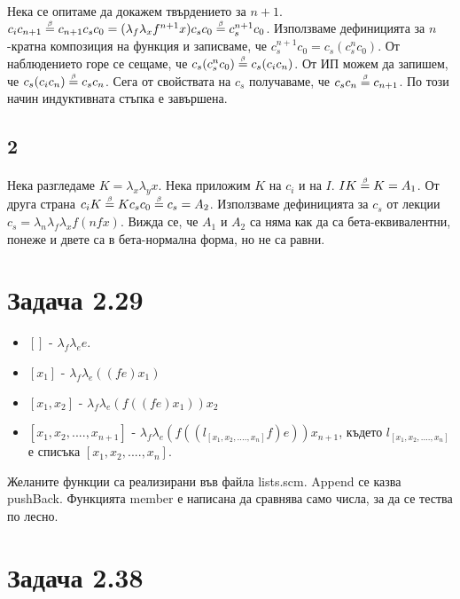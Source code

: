 \documentclass[12pt]{article}
\begin{document}
\paragraph*{}
Нека се опитаме да докажем твърдението за $n+1$. $c_i c_{n+1} \betaeq c_{n+1} c_s c_0 = (\lambda_f \lambda_x f^{n+1} x) c_s c_0 \betaeq c_s^{n+1} c_0$. Използваме дефиницията за $n$-кратна композиция на функция и записваме, че $c_s^{n+1} c_0 = c_s (c_s^n c_0)$. От наблюдението горе се сещаме, че $c_s (c_s^n c_0) \betaeq c_s (c_i c_n)$. От ИП можем да запишем, че $c_s (c_i c_n) \betaeq c_s c_n$. Сега от свойствата на $c_s$ получаваме, че $c_s c_n \betaeq c_{n+1}$. По този начин индуктивната стъпка е завършена.

\subsection*{2}
\paragraph*{}
Нека разгледаме $K = \lambda_x \lambda_y x$. Нека приложим $K$ на $c_i$ и на $I$. $I K \betaeq K = A_1$. От друга страна $c_i K \betaeq K c_s c_0 \betaeq c_s = A_2$. Използваме дефиницията за $c_s$ от лекции $c_s = \lambda_n \lambda_f \lambda_x f (n f x)$. Вижда се, че $A_1$ и $A_2$ са няма как да са бета-еквивалентни, понеже и двете са в бета-нормална форма, но не са равни. 

\section*{Задача 2.29}
\begin{itemize}
	\item $[]$ - $\lambda_f \lambda_e e$.
	\item $[x_1]$ - $\lambda_f \lambda_e ((fe)x_1)$	
	\item $[x_1, x_2]$ - $\lambda_f \lambda_e (f((fe)x_1))x_2$
	\item $[x_1, x_2, ...., x_{n+1}]$ - $\lambda_f \lambda_e (f((l_{[x_1, x_2, ...., x_{n}]} f) e)) x_{n+1}$, където $l_{[x_1, x_2, ...., x_{n}]}$ е списъка $[x_1, x_2, ...., x_{n}]$. 	
\end{itemize}

Желаните функции са реализирани във файла lists.scm. Append се казва pushBack. Функцията member е написана да сравнява само числа, за да се тества по лесно.

\section*{Задача 2.38}
\end{document}

